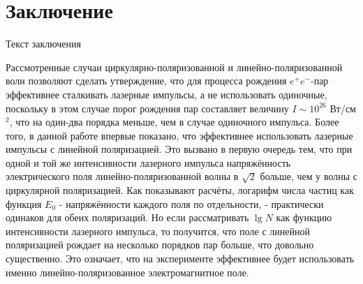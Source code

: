 
\section{Заключение}

Текст заключения

Рассмотренные случаи циркулярно-поляризованной и
линейно-поляризованной волн позволяют сделать утверждение, что для
процесса рождения $e^+e^-$-пар эффективнее сталкивать лазерные
импульсы, а не использовать одиночные, поскольку в этом случае порог
рождения пар составляет величину $I \sim 10^{26}$ Вт/см$^2$, что на
один-два порядка меньше, чем в случае одиночного импульса. Более
того, в данной работе впервые показано, что эффективнее использовать
лазерные импульсы с линейной поляризацией. Это вызвано в первую
очередь тем, что при одной и той же интенсивности лазерного импульса
напряжённость электрического поля линейно-поляризованной волны в
$\sqrt{2}$ больше, чем у волны с циркулярной поляризацией. Как
показывают расчёты, логарифм числа частиц как функция $E_0$ -
напряжённости каждого поля по отдельности, - практически одинаков
для обеих поляризаций. Но если рассматривать $\lg N$ как функцию
интенсивности лазерного импульса, то получится, что поле с линейной
поляризацией рождает на несколько порядков пар больше, что довольно
существенно. Это означает, что на эксперименте эффективнее будет
использовать именно линейно-поляризованное электромагнитное поле.
